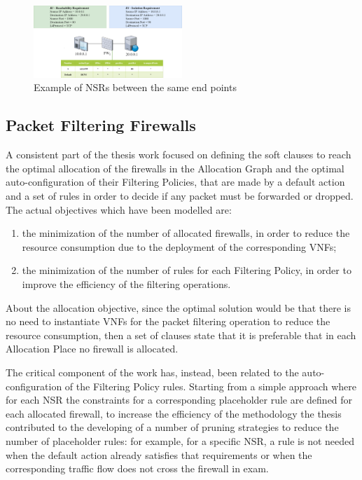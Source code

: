 \documentclass[10pt,a4paper,roman, twocolumn]{article}
\begin{document}
\begin{figure}[tbh]
	\centerline{\includegraphics[width=0.5\textwidth]{images/multiple.png}}
	\caption{Example of NSRs between the same end points}
	\label{fig:multiple03}
\end{figure}

\subsection{Packet Filtering Firewalls}

A consistent part of the thesis work focused on defining the soft clauses to reach the optimal allocation of the firewalls in the Allocation Graph and the optimal auto-configuration of their Filtering Policies, that are made by a default action and a set of rules in order to decide if any packet must be forwarded or dropped. The actual objectives which have been modelled are:
\begin{enumerate}
	\setlength\itemsep{-0.3em}
	\item the minimization of the number of allocated firewalls, in order to reduce the resource consumption due to the deployment of the corresponding VNFs;
	\item the minimization of the number of rules for each Filtering Policy, in order to improve the efficiency of the filtering operations. 
\end{enumerate}

About the allocation objective, since the optimal solution would be that there is no need to instantiate VNFs for the packet filtering operation to reduce the resource consumption, then a set of clauses state that it is preferable that in each Allocation Place no firewall is allocated.%


The critical component of the work has, instead, been related to the auto-configuration of the Filtering Policy rules. Starting from a simple approach where for each NSR the constraints for a corresponding placeholder rule are defined for each allocated firewall, to increase the efficiency of the methodology the thesis contributed to the developing of a number of pruning strategies to reduce the number of placeholder rules: for example, for a specific NSR, a rule is not needed when the default action already satisfies that requirements or when the corresponding traffic flow does not cross the firewall in exam.
\end{document}

